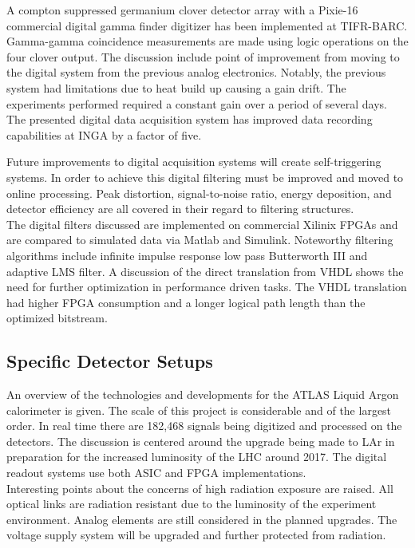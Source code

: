 \documentclass[12pt]{article}
\begin{document}
\begin{doublespacing}
{\large\textbf{\cite{Palit201290}}}
A compton suppressed germanium clover detector array with a Pixie-16 commercial digital gamma finder digitizer has been implemented at TIFR-BARC.
Gamma-gamma coincidence measurements are made using logic operations on the four clover output.
The discussion include point of improvement from moving to the digital system from the previous analog electronics.
Notably, the previous system had limitations due to heat build up causing a gain drift.
The experiments performed required a constant gain over a period of several days.
The presented digital data acquisition system has improved data recording capabilities at INGA by a factor of five.


{\large\textbf{\cite{Alberto200999}}}
Future improvements to digital acquisition systems will create self-triggering systems.
In order to achieve this digital filtering must be improved and moved to online processing.
Peak distortion, signal-to-noise ratio, energy deposition, and detector efficiency are all covered in their regard to filtering structures.
\\

The digital filters discussed are implemented on commercial Xilinix FPGAs and are compared to simulated data via Matlab and Simulink.
Noteworthy filtering algorithms include infinite impulse response low pass Butterworth III and adaptive LMS filter.
A discussion of the direct translation from VHDL shows the need for further optimization in performance driven tasks.
The VHDL translation had higher FPGA consumption and a longer logical path length than the optimized bitstream.


\subsection{Specific Detector Setups}

{\large\textbf{\cite{Chen2010261}}}
An overview of the technologies and developments for the ATLAS Liquid Argon calorimeter is given.
The scale of this project is considerable and of the largest order.
In real time there are 182,468 signals being digitized and processed on the detectors.
The discussion is centered around the upgrade being made to LAr in preparation for the increased luminosity of the LHC around 2017. The digital readout systems use both ASIC and FPGA implementations.
\\

Interesting points about the concerns of high radiation exposure are raised.
All optical links are radiation resistant due to the luminosity of the experiment environment.
Analog elements are still considered in the planned upgrades.
The voltage supply system will be upgraded and further protected from radiation.



\end{doublespacing}
\end{document}
